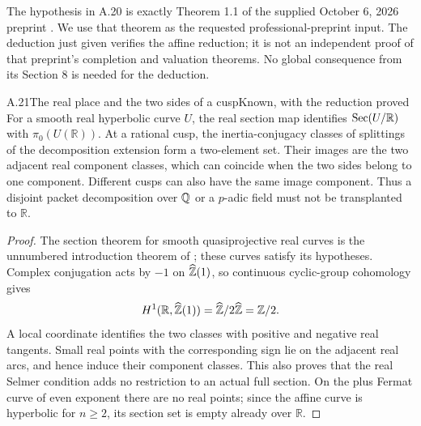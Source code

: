 
The hypothesis in A.20 is exactly Theorem 1.1 of the supplied October 6, 2026 preprint \citep{OpenAILocal2026}. We use that theorem as the requested professional-preprint input. The deduction just given verifies the affine reduction; it is not an independent proof of that preprint's completion and valuation theorems. No global consequence from its Section 8 is needed for the deduction.

\begin{statement}{A.21}{The real place and the two sides of a cusp}{Known, with the reduction proved}
For a smooth real hyperbolic curve $U$, the real section map identifies $\operatorname{Sec}(U/\mathbb R)$ with $\pi_0(U(\mathbb R))$. At a rational cusp, the inertia-conjugacy classes of splittings of the decomposition extension form a two-element set. Their images are the two adjacent real component classes, which can coincide when the two sides belong to one component. Different cusps can also have the same image component. Thus a disjoint packet decomposition over $\mathbb Q$ or a $p$-adic field must not be transplanted to $\mathbb R$.
\end{statement}
\begin{proof}
The section theorem for smooth quasiprojective real curves is the unnumbered introduction theorem of \citet{BrescianiVistoli2020}; these curves satisfy its hypotheses. Complex conjugation acts by $-1$ on $\widehat{\mathbb Z}(1)$, so continuous cyclic-group cohomology gives
\[
H^1(\mathbb R,\widehat{\mathbb Z}(1))=\widehat{\mathbb Z}/2\widehat{\mathbb Z}=\mathbb Z/2.
\]
A local coordinate identifies the two classes with positive and negative real tangents. Small real points with the corresponding sign lie on the adjacent real arcs, and hence induce their component classes. This also proves that the real Selmer condition adds no restriction to an actual full section. On the plus Fermat curve of even exponent there are no real points; since the affine curve is hyperbolic for $n\ge2$, its section set is empty already over $\mathbb R$.
\end{proof}

